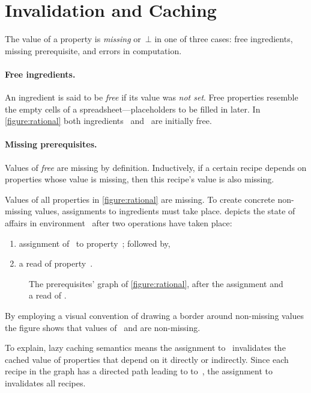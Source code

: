\section{Invalidation and Caching}
The value of a property is \emph{missing} or~$⊥$ in one of three cases: free
ingredients, missing prerequisite, and errors in computation.

\paragraph{Free ingredients.}
An ingredient is said to be \emph{free} if its value was \emph{not
set}. Free properties resemble the empty cells of a spreadsheet---placeholders
to be filled in later. In \cref{figure:rational} both ingredients~
and~ are initially free.

\paragraph{Missing prerequisites.}
Values of \emph{free} are missing by definition. Inductively, if a certain
recipe depends on properties whose value is missing, then this recipe's value
is also missing.

Values of all properties in \cref{figure:rational} are missing. To create
concrete non-missing values, assignments to ingredients must take place.
 depicts the state of affairs in
environment~ after two operations have taken place:
\begin{enumerate}
  \item assignment of~ to property~; followed by,
  \item a read of property~.
\end{enumerate}

  \begin{figure}
    \caption{\label{figure:rational:1}%
      The prerequisites' graph of \cref{figure:rational},
      after the assignment  and a read of .
    }
    \begin{adjustbox}{max width=\columnwidth}
      
    \end{adjustbox}
  \end{figure}

By employing a visual convention of drawing a border around non-missing values
the figure shows that values of~ and  are non-missing.

To explain, lazy caching semantics means the assignment to~ invalidates
the cached value of properties that depend on it directly
or indirectly. Since each recipe in the graph has a directed path
leading to to~, the assignment to~ invalidates all recipes.

